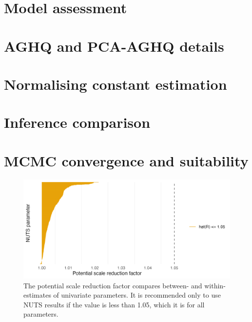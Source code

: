 \documentclass[a4paper, nobind]{templates/ociamthesis}
\begin{document}
\hypertarget{model-assessment-1}{%
\section{Model assessment}\label{model-assessment-1}}

\hypertarget{aghq-and-pca-aghq-details}{%
\section{AGHQ and PCA-AGHQ details}\label{aghq-and-pca-aghq-details}}

\hypertarget{normalising-constant-estimation}{%
\section{Normalising constant estimation}\label{normalising-constant-estimation}}

\hypertarget{inference-comparison-1}{%
\section{Inference comparison}\label{inference-comparison-1}}

\hypertarget{mcmc-convergence-and-suitability}{%
\section{MCMC convergence and suitability}\label{mcmc-convergence-and-suitability}}

\begin{figure}

{\centering \includegraphics[width=0.95\linewidth]{resources/naomi-aghq/20230811-095752-5b8181d8/depends/rhat} 

}

\caption{The potential scale reduction factor compares between- and within- estimates of univariate parameters. It is recommended only to use NUTS results if the value is less than 1.05, which it is for all parameters.}\label{fig:rhat}
\end{figure}
\end{document}
